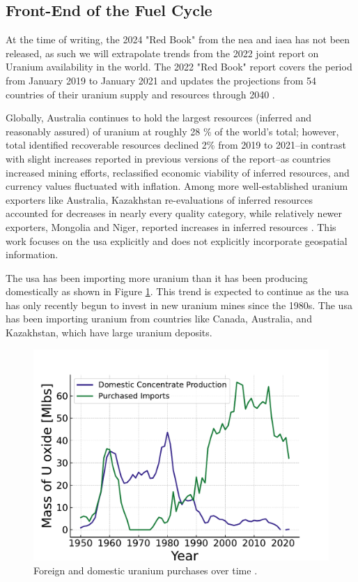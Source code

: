 \subsection{Front-End of the Fuel Cycle}
\label{sec:front_end}
At the time of writing, the 2024 "Red Book" from the \gls{nea} and \gls{iaea} has not been released, as such we will extrapolate trends from the 2022 joint report on Uranium availability in the world. The 2022 "Red Book" report covers the period from January 2019 to January 2021 and updates the projections from 54 countries of their uranium supply and resources through 2040 \cite{nea_red_book_2022}.

Globally, Australia continues to hold the largest resources (inferred and reasonably assured) of uranium at roughly 28 \% of the world's total; however, total identified recoverable resources declined 2\% from 2019 to 2021--in contrast with slight increases reported in previous versions of the report--as countries increased mining efforts, reclassified economic viability of inferred resources, and currency values fluctuated with inflation. Among more well-established uranium exporters like Australia, Kazakhstan re-evaluations of inferred resources accounted for decreases in nearly every quality category, while relatively newer exporters, Mongolia and Niger, reported increases in inferred resources \cite{nea_red_book_2022}. This work focuses on the \gls{usa} explicitly and does not explicitly incorporate geospatial information.

The \gls{usa} has been importing more uranium than it has been producing domestically as shown in Figure \ref{fig:foregin_u3o8}. This trend is expected to continue as the \gls{usa} has only recently begun to invest in new uranium mines since the 1980s. The \gls{usa} has been importing uranium from countries like Canada, Australia, and Kazakhstan, which have large uranium deposits.

\begin{figure}[!h]
   \centering
   \includegraphics[scale=0.8]{images/intro/uranium_production_imports.pdf}
   \caption{Foreign and domestic uranium purchases over time \cite{eia_monthly_energy_review_2024}.}
   \label{fig:foregin_u3o8}
\end{figure}

